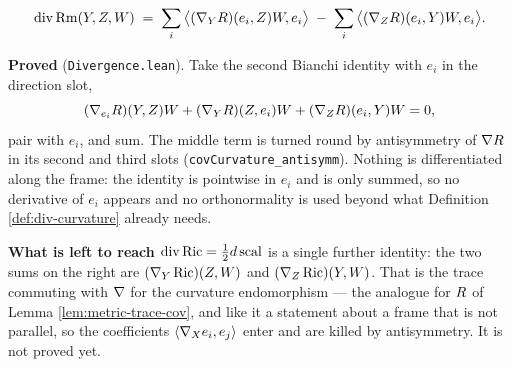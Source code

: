 \begin{lemma}
  \label{lem:traced-bianchi}
  \leanok
  \[
    \operatorname{div}\operatorname{Rm}(Y,Z,W)
      \;=\; \sum_i \big\langle (\nabla_YR)(e_i,Z)W, e_i\big\rangle
          \;-\; \sum_i \big\langle (\nabla_ZR)(e_i,Y)W, e_i\big\rangle .
  \]

  \textbf{Proved} (\texttt{Divergence.lean}). Take the second Bianchi identity
  with $e_i$ in the direction slot,
  \[
    (\nabla_{e_i}R)(Y,Z)W + (\nabla_YR)(Z,e_i)W + (\nabla_ZR)(e_i,Y)W = 0,
  \]
  pair with $e_i$, and sum. The middle term is turned round by antisymmetry of
  $\nabla R$ in its second and third slots
  (\texttt{covCurvature\_antisymm}). Nothing is differentiated along the frame:
  the identity is pointwise in $e_i$ and is only summed, so no derivative of
  $e_i$ appears and no orthonormality is used beyond what
  Definition \ref{def:div-curvature} already needs.

  \textbf{What is left to reach $\operatorname{div}\operatorname{Ric} = \tfrac12 d\operatorname{scal}$} is a
  single further identity: the two sums on the right are $(\nabla_Y\operatorname{Ric})(Z,W)$ and
  $(\nabla_Z\operatorname{Ric})(Y,W)$. That is the trace commuting with $\nabla$ for the curvature
  endomorphism --- the analogue for $R$ of Lemma
  \ref{lem:metric-trace-cov}, and like it a statement about a frame that is not
  parallel, so the coefficients $\langle \nabla_X e_i, e_j\rangle$ enter and are
  killed by antisymmetry. It is not proved yet.
\end{lemma}

